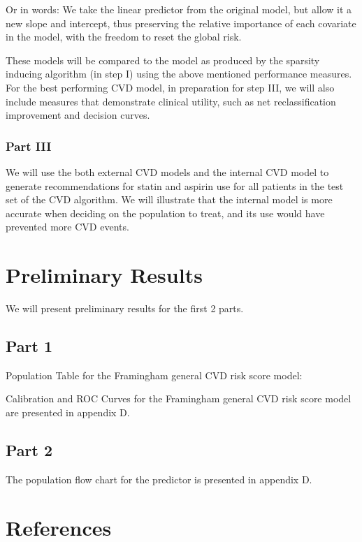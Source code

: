 \documentclass[a4paper,12pt]{article}
\begin{document}
		Or in words: We take the linear predictor from the original model, but allow it a new slope and intercept, thus preserving the relative importance of each covariate in the model, with the freedom to reset the global risk.
	
		These models will be compared to the model as produced by the sparsity inducing algorithm (in step I) using the above mentioned performance measures. For the best performing CVD model, in preparation for step III, we will also include measures that demonstrate clinical utility, such as net reclassification improvement\cite{Pencina2008} and decision curves\cite{Vickers2016}.
		
		\subsubsection{Part III}
		We will use the both external CVD models and the internal CVD model to generate recommendations for statin and aspirin use for all patients in the test set of the CVD algorithm. We will illustrate that the internal model is more accurate when deciding on the population to treat, and its use would have prevented more CVD events.
		
	\section{Preliminary Results}
	We will present preliminary results for the first 2 parts.

	\subsection{Part 1}

	Population Table for the Framingham general CVD risk score\cite{DAgostino2008} model:

	
	Calibration and ROC Curves for the Framingham general CVD risk score model are presented in appendix D.
	
	\subsection{Part 2}
	
	The population flow chart for the predictor is presented in appendix D.
	
	\section{References}
	
\end{document}
